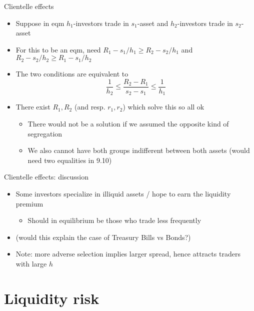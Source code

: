 \documentclass[english,10pt
,aspectratio=169
]{beamer}
\begin{document}
\begin{frame}{Clientelle effects}
	\begin{itemize}
		\item Suppose in eqm $h_1$-investors trade in $s_1$-asset and $h_2$-investors trade in $s_2$-asset
		\item For this to be an eqm, need $R_1 - s_1/h_1 \geq R_2 - s_2/h_1$ and $R_2 - s_2/h_2 \geq R_1 - s_1/h_2$
		\item The two conditions are equivalent to
		\begin{equation}\tag{9.10}
			\frac{1}{h_2} \leq \frac{R_2 - R_1}{s_2 - s_1} \leq \frac{1}{h_1}
		\end{equation}
		\pause 
		\item There exist $R_1,R_2$ (and resp. $r_1,r_2$) which solve this so all ok
		\begin{itemize}
			\item There would not be a solution if we assumed the opposite kind of segregation
			\item We also cannot have both groups indifferent between both assets (would need two equalities in 9.10)
		\end{itemize}
	\end{itemize}
\end{frame}


\begin{frame}{Clientelle effects: discussion}
	\begin{itemize}
		\item Some investors specialize in illiquid assets / hope to earn the liquidity premium
		\begin{itemize}
			\item Should in equilibrium be those who trade less frequently
		\end{itemize}
		\item (would this explain the case of Treasury Bills vs Bonds?) 
		\item Note: more adverse selection implies larger spread, hence attracts traders with large $h$
	\end{itemize}
\end{frame}


\section{Liquidity risk}
\end{document}
